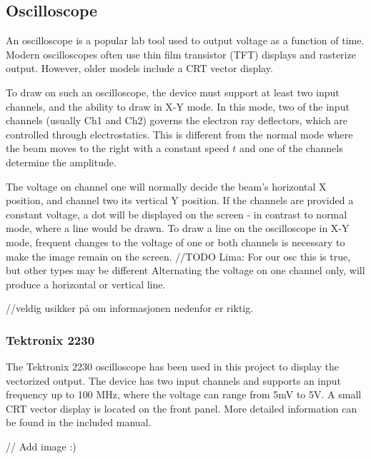 \subsection{Oscilloscope}
An oscilloscope is a popular lab tool used to output voltage as a function of time.
Modern oscilloscopes often use thin film transistor (TFT) displays and rasterize output. 
However, older models include a CRT vector display.

To draw on such an oscilloscope, the device must support at least two input channels, and the ability to draw in X-Y mode.
In this mode, two of the input channels (usually Ch1 and Ch2) governs the electron ray deflectors, which are controlled through electrostatics. 
This is different from the normal mode where the beam moves to the right with a constant speed \( t \) and one of the channels determine the amplitude.

The voltage on channel one will normally decide the beam's horizontal X position, and channel two its vertical Y position.
If the channels are provided a constant voltage, a dot will be displayed on the screen - in contrast to normal mode, where a line would be drawn.
To draw a line on the oscilloscope in X-Y mode, frequent changes to the voltage of one or both channels is necessary to make the image remain on the screen. //TODO Lima: For our osc this is true, but other types may be different
Alternating the voltage on one channel only, will produce a horizontal or vertical line.

//veldig usikker på om informasjonen nedenfor er riktig.

\subsubsection{Tektronix 2230}
The Tektronix 2230 oscilloscope has been used in this project to display the vectorized output.
The device has two input channels and supports an input frequency up to 100 MHz, where the voltage can range from 5mV to 5V.
A small CRT vector display is located on the front panel.
More detailed information can be found in the included manual\cite{tektronix2230}.

// Add image :)


